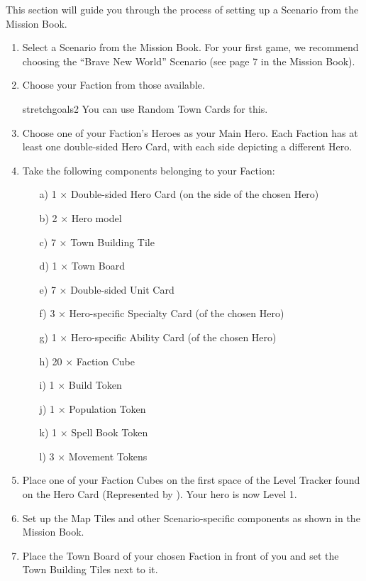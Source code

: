 \begin{multicols*}{2}

This section will guide you through the process of setting up a Scenario from the Mission Book.

\begin{enumerate}
  \item Select a Scenario from the Mission Book.
    For your first game, we recommend choosing the ``Brave New World'' Scenario (see page 7 in the Mission Book).
  \item Choose your Faction from those available.
  \begin{expansion}[before skip balanced=0.3em]{stretchgoals2}
    You can use Random Town Cards for this.
  \end{expansion}
  \item Choose one of your Faction's Heroes as your Main Hero.
    Each Faction has at least one double-sided Hero Card, with each side depicting a different Hero.
  \item Take the following components belonging to your Faction:
  \begin{itemize}
    \item[a)]1 × Double-sided Hero Card (on the side of the chosen Hero)
    \item[b)]2 × Hero model
    \item[c)]7 × Town Building Tile
    \item[d)]1 × Town Board
    \item[e)]7 × Double-sided Unit Card
    \item[f)]3 × Hero-specific Specialty Card (of the chosen Hero)
    \item[g)]1 × Hero-specific Ability Card (of the chosen Hero)
    \item[h)]20 × Faction Cube
    \item[i)]1 × Build Token
    \item[j)]1 × Population Token
    \item[k)]1 × Spell Book Token
    \item[l)]3 × Movement Tokens
  \end{itemize}
  \item Place one of your Faction Cubes on the first space of the Level Tracker found on the Hero Card (Represented by ).
    Your hero is now Level 1.
  \item Set up the Map Tiles and other Scenario-specific components as shown in the Mission Book.
  \item Place the Town Board of your chosen Faction in front of you and set the Town Building Tiles next to it.

\end{enumerate}
\end{multicols*}
